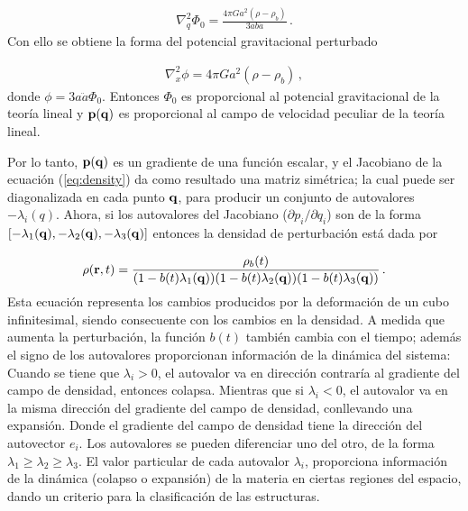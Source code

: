 \begin{align}
\nabla_{q}^{2}\Phi_{0}=\frac{4\pi Ga^{2}(\rho-\rho_{b})}{3ab\ddot{a}}\,.
\end{align}
%
Con ello se obtiene la forma del potencial gravitacional perturbado

\begin{align}
\nabla_{x}^{2}\phi=4\pi Ga^{2}(\rho-\rho_{b})\,,
\end{align} 
%
donde $\phi = 3a\ddot{a}\Phi_{0}$.  Entonces $\Phi_{0}$ es proporcional al potencial gravitacional de la teoría lineal y ${\bf{p(q)}}$ es proporcional al campo de velocidad peculiar de la teoría lineal. 

Por lo tanto, ${\bf{p(q)}}$ es un gradiente de una función escalar, y el Jacobiano de la ecuación (\ref{eq:density}) da como resultado una matriz simétrica; la cual puede ser diagonalizada en cada punto $\bf{q}$, para producir un conjunto de autovalores $-\lambda_{i}(q)$. Ahora, si los autovalores del Jacobiano ($\partial p_{i}/\partial q_{i}$) son de la forma $[-\lambda_{1}({\bf{q}}),-\lambda_{2}({\bf{q}}),-\lambda_{3}({\bf{q}})]$ entonces la densidad de perturbación está dada por 

\begin{align}
\rho({\bf{r}},t)=\frac{\rho_{b}(t)}{(1-b(t)\lambda_{1}({\bf{q}}))(1-b(t)\lambda_{2}({\bf{q}}))(1-b(t)\lambda_{3}({\bf{q}}))}\,.
\end{align}
%
Esta ecuación representa los cambios producidos por la deformación de un cubo infinitesimal, siendo consecuente con los cambios en la densidad. A medida que aumenta la perturbación, la función $b(t)$ también cambia con el tiempo; además el signo de los autovalores proporcionan información de la dinámica del sistema: Cuando se tiene que $\lambda_{i}>0$, el autovalor va en dirección contraría al gradiente del campo de densidad, entonces colapsa. Mientras que si $\lambda_{i}<0$, el autovalor va en la misma dirección del gradiente del campo de densidad, conllevando una expansión. Donde el gradiente del campo de densidad tiene la dirección del autovector $e_{i}$. Los autovalores se pueden diferenciar uno del otro, de la forma $\lambda_{1}\geq \lambda_{2}\geq \lambda_{3}$. El valor particular de cada autovalor $\lambda_{i}$, proporciona información de la dinámica (colapso o expansión) de la materia en ciertas regiones del espacio, dando un criterio para la clasificación de las estructuras.  

